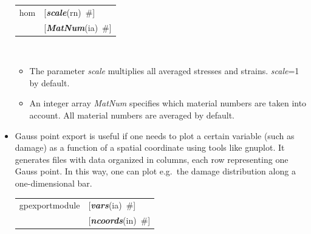 \documentclass[a4paper]{article}
\makeatletter
\newcommand{\param}[1]{{\em #1}}
\newcommand{\keywordnotype}[1]{\mbox{{\it{\bf{#1}}}}}
\newcommand{\keyword}[2]{\mbox{{\keywordnotype{#1}\tiny (#2)}}}
\newcommand{\field}[2]{\mbox{\keyword{#1}{#2}~\#}}
\newcommand{\optField}[2]{\mbox{[\field{#1}{#2}]}}
\newenvironment{record}[1][]{\begin{tabular}{|ll}}{\end{tabular}\\}
\newcommand{\recentry}[2]{{#1}&{#2}\\}
\newcounter{rcc}
\newenvironment{record}[1][\textwidth]{\setcounter{rcc}{0}\begin{tabular*}{#1}{|ll@{\extracolsep{\fill}}r}}{\end{tabular*}\\}
\newcommand{\recentry}[2]{\ifthenelse{\value{rcc}>0}{&$\backslash$ \\}{\setcounter{rcc}{1}}{#1}&{#2}}
\makeatother
\begin{document}
\begin{itemize}
\begin{record}[0.9\textwidth]
    \recentry{hom}{\optField{scale}{rn}} \recentry{}{\optField{MatNum}{ia}}
\end{record}
\begin{itemize}

\item The parameter \param{scale} multiplies all averaged stresses and strains. \param{scale}=1 by default.

\item An integer array \param{MatNum} specifies which material numbers are taken into account. All material numbers are averaged by default.
\end{itemize}

\item Gauss point export is useful if one needs to plot a certain variable
(such as damage) as a function of a spatial coordinate using tools like
gnuplot. It generates files with data organized in columns, each row
representing one Gauss point. In this way, one can plot e.g.\ the damage
distribution along a one-dimensional bar.

\begin{record}[0.9\textwidth]
    \recentry{gpexportmodule}{\optField{vars}{ia}} \recentry{}{\optField{ncoords}{in}}
  \end{record}


\end{itemize}
\end{document}
